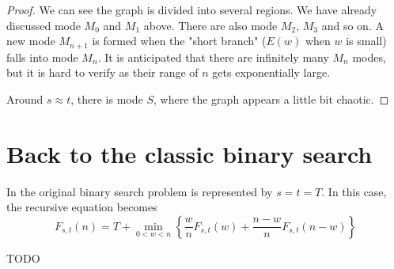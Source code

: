 \documentclass[]{article}
\begin{document}
\begin{proof}
	We can see the graph is divided into several regions. We have already discussed mode $M_0$ and $M_1$ above. There are also mode $M_2$, $M_3$ and so on. A new mode $M_{n+1}$ is formed when the "short branch" ($E(w)$ when $w$ is small) falls into mode $M_n$. It is anticipated that there are infinitely many $M_n$ modes, but it is hard to verify as their range of $n$ gets exponentially large.
	
	Around $s \approx t$, there is mode $S$, where the graph appears a little bit chaotic.
\end{proof}



\section{Back to the classic binary search}
In the original binary search problem is represented by $s = t = T$. In this case, the recursive equation becomes
\[
F_{s,t}(n) = T + \min_{0<w<n}\left\{\frac{w}{n}F_{s,t}(w) + \frac{n-w}{n}F_{s,t}(n-w)\right\}
\]

TODO
\end{document}
